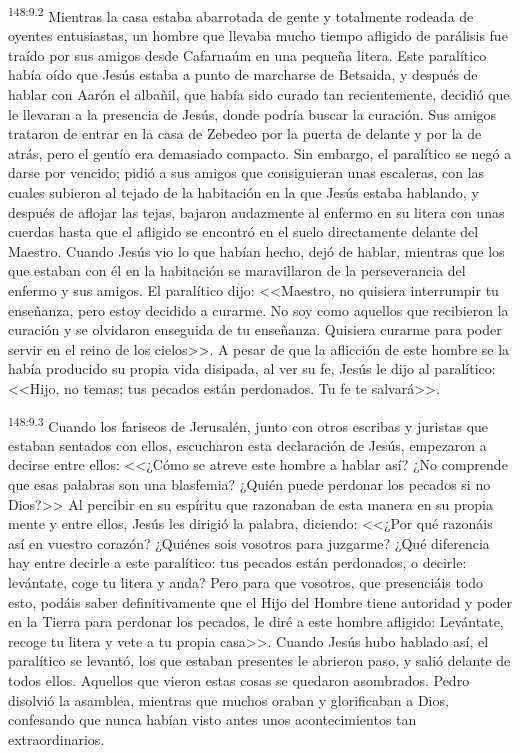 \par 
\textsuperscript{148:9.2} Mientras la casa estaba abarrotada de gente y totalmente rodeada de oyentes entusiastas, un hombre que llevaba mucho tiempo afligido de parálisis fue traído por sus amigos desde Cafarnaúm en una pequeña litera. Este paralítico había oído que Jesús estaba a punto de marcharse de Betsaida, y después de hablar con Aarón el albañil, que había sido curado tan recientemente, decidió que le llevaran a la presencia de Jesús, donde podría buscar la curación. Sus amigos trataron de entrar en la casa de Zebedeo por la puerta de delante y por la de atrás, pero el gentío era demasiado compacto. Sin embargo, el paralítico se negó a darse por vencido; pidió a sus amigos que consiguieran unas escaleras, con las cuales subieron al tejado de la habitación en la que Jesús estaba hablando, y después de aflojar las tejas, bajaron audazmente al enfermo en su litera con unas cuerdas hasta que el afligido se encontró en el suelo directamente delante del Maestro. Cuando Jesús vio lo que habían hecho, dejó de hablar, mientras que los que estaban con él en la habitación se maravillaron de la perseverancia del enfermo y sus amigos. El paralítico dijo: <<Maestro, no quisiera interrumpir tu enseñanza, pero estoy decidido a curarme. No soy como aquellos que recibieron la curación y se olvidaron enseguida de tu enseñanza. Quisiera curarme para poder servir en el reino de los cielos>>. A pesar de que la aflicción de este hombre se la había producido su propia vida disipada, al ver su fe, Jesús le dijo al paralítico: <<Hijo, no temas; tus pecados están perdonados. Tu fe te salvará>>.

\par 
\textsuperscript{148:9.3} Cuando los fariseos de Jerusalén, junto con otros escribas y juristas que estaban sentados con ellos, escucharon esta declaración de Jesús, empezaron a decirse entre ellos: <<¿Cómo se atreve este hombre a hablar así? ¿No comprende que esas palabras son una blasfemia? ¿Quién puede perdonar los pecados si no Dios?>> Al percibir en su espíritu que razonaban de esta manera en su propia mente y entre ellos, Jesús les dirigió la palabra, diciendo: <<¿Por qué razonáis así en vuestro corazón? ¿Quiénes sois vosotros para juzgarme? ¿Qué diferencia hay entre decirle a este paralítico: tus pecados están perdonados, o decirle: levántate, coge tu litera y anda? Pero para que vosotros, que presenciáis todo esto, podáis saber definitivamente que el Hijo del Hombre tiene autoridad y poder en la Tierra para perdonar los pecados, le diré a este hombre afligido: Levántate, recoge tu litera y vete a tu propia casa>>. Cuando Jesús hubo hablado así, el paralítico se levantó, los que estaban presentes le abrieron paso, y salió delante de todos ellos. Aquellos que vieron estas cosas se quedaron asombrados. Pedro disolvió la asamblea, mientras que muchos oraban y glorificaban a Dios, confesando que nunca habían visto antes unos acontecimientos tan extraordinarios.

